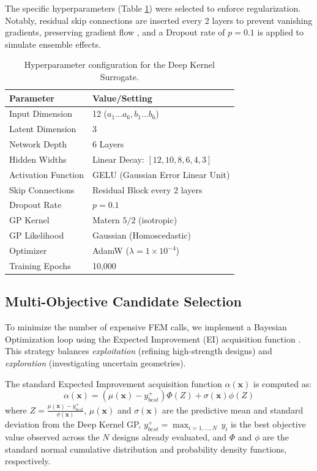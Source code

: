 \documentclass[
  preprint,
  12pt,
  a4paper
]{elsarticle}
\newcommand{\new}[1]{#1}
\begin{document}
The specific hyperparameters (Table \ref{tab:hyperparameters}) were selected to enforce regularization. Notably, residual skip connections are inserted every 2 layers to prevent vanishing gradients, preserving gradient flow \cite{he2016deep}, and a Dropout rate of $p=0.1$ is applied to simulate ensemble effects.

\begin{table}[htbp]
    \centering
    \caption{Hyperparameter configuration for the Deep Kernel Surrogate.}
    \label{tab:hyperparameters}
    \begin{tabular}{l l}
        \toprule
        \textbf{Parameter} & \textbf{Value/Setting} \\
        \midrule
        Input Dimension & 12 ($a_1\dots a_6, b_1\dots b_6$) \\
        Latent Dimension & 3 \\
        Network Depth & 6 Layers \\
        Hidden Widths & Linear Decay: $[12, 10, 8, 6, 4, 3]$ \\
        Activation Function & GELU (Gaussian Error Linear Unit) \\
        Skip Connections & Residual Block every 2 layers \\
        Dropout Rate & $p=0.1$ \\
        \midrule
        GP Kernel & \new{Matern $5/2$ (isotropic)} \\
        GP Likelihood & Gaussian (Homoscedastic) \\
        Optimizer & AdamW ($\lambda=1\times 10^{-4}$) \\
        Training Epochs & 10,000 \\
        \bottomrule
    \end{tabular}
\end{table}

\subsection{Multi-Objective Candidate Selection}
To minimize the number of expensive FEM calls, we implement a Bayesian Optimization loop using the Expected Improvement (EI) acquisition function \cite{jones1998efficient}. This strategy balances \textit{exploitation} (refining high-strength designs) and \textit{exploration} (investigating uncertain geometries).

The standard \new{Expected Improvement} acquisition function $\alpha(\mathbf{x})$ is computed as:
\begin{equation}
    \new{\alpha(\mathbf{x}) =} (\mu(\mathbf{x}) - y_{best}^+) \Phi(Z) + \sigma(\mathbf{x}) \phi(Z)
\end{equation}
where $Z = \frac{\mu(\mathbf{x}) - y_{best}^+}{\sigma(\mathbf{x})}$, $\mu(\mathbf{x})$ and $\sigma(\mathbf{x})$ are the predictive mean and standard deviation from the Deep Kernel GP, \new{$y_{best}^+ = \max_{i=1,\dots,N}\, y_i$ is the best objective value observed across the $N$ designs already evaluated,} and $\Phi$ and $\phi$ are the standard normal cumulative distribution and probability density functions, respectively.
\end{document}
